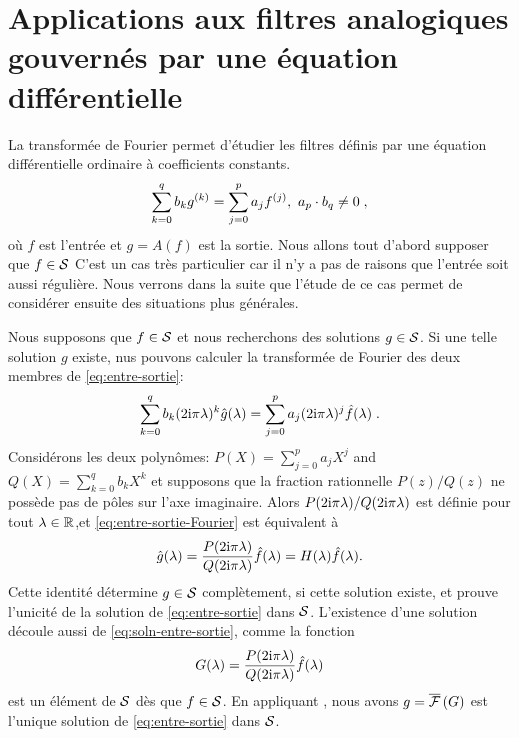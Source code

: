 \section{Applications aux filtres analogiques gouvern\'es par une \'equation diff\'erentielle}
La transform\'ee de Fourier permet d'\'etudier les filtres d\'efinis par une \'equation diff\'erentielle ordinaire \`{a} coefficients constants.
\begin{equation}
\label{eq:entre-sortie}
\sum_{k=0}^{q}b_{k}g^{(k)}=\sum_{j=0}^{p}a_{j}f^{(j)},\ a_{p}\cdot b_{q}\neq 0 \;,
\end{equation}
o\`{u} $f$ est l'entr\'ee et $g=A(f)$ est la sortie. Nous allons tout d'abord supposer que $f \in \mathcal{S}$
C'est un cas tr\`es particulier car il n'y a pas de raisons que l'entr\'ee soit aussi r\'eguli\`ere. Nous verrons dans la suite que l'\'etude de ce cas permet de consid\'erer ensuite des situations plus g\'en\'erales.

Nous supposons que $f\in \mathcal{S}$ et nous recherchons des solutions $g \in \mathcal{S}$.
Si une telle solution $g$ existe, nus pouvons calculer la transform\'ee de Fourier des deux membres de \eqref{eq:entre-sortie}:
\begin{equation}
\label{eq:entre-sortie-Fourier}
\sum_{k=0}^{q}b_{k}(2\mathrm{i}\pi\lambda)^{k}\hat{g}(\lambda)=\sum_{j=0}^{p}a_{j}(2\mathrm{i} \pi\lambda)^{j}\hat{f}(\lambda) \;.
\end{equation}
Consid\'erons les deux polyn\^omes: $P(X)=\displaystyle \sum_{j=0}^{p}a_{j}X^{j}$ and $Q(X)=\displaystyle \sum_{k=0}^{q}b_{k}X^{k}$
et supposons que la fraction rationnelle $P(z)/Q(z)$ ne poss\`{e}de  pas de p\^oles sur l'axe imaginaire.
Alors $P(2 \mathrm{i} \pi\lambda)/Q(2 \mathrm{i} \pi\lambda)$ est d\'efinie pour tout $\lambda \in \mathbb{R}$,et \eqref{eq:entre-sortie-Fourier}
est \'equivalent \`{a}
\begin{equation}
\label{eq:soln-entre-sortie}
\hat{g}(\lambda)=\frac{P(2\mathrm{i}\pi\lambda)}{Q(2\mathrm{i}\pi\lambda)}\hat{f}(\lambda)= H(\lambda) \hat{f}(\lambda).
\end{equation}
Cette identit\'e d\'etermine $g \in \mathcal{S}$ compl\`etement, si cette solution existe, et prouve l'unicit\'e de la solution de \eqref{eq:entre-sortie} dans $\mathcal{S}$. L'existence d'une solution d\'ecoule aussi de \eqref{eq:soln-entre-sortie}, comme la fonction
$$
G(\lambda)=\frac{P(2 \mathrm{i} \pi\lambda)}{Q(2 \mathrm{i} \pi\lambda)}\hat{f}(\lambda)
$$
est un \'el\'ement de $\mathcal{S}$ d\`es que  $f \in \mathcal{S}$.
En appliquant , nous avons $g= \overline{\mathcal{F}}\left( G \right)$ est l'unique solution de \eqref{eq:entre-sortie} dans $\mathcal{S}$.


